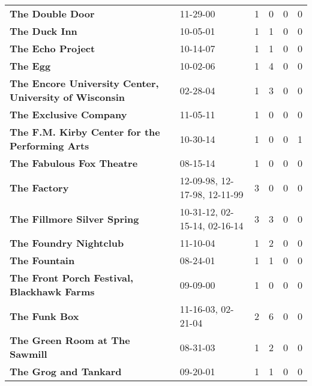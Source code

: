 \begin{supertabular}{llllll}
                                             \textbf{The Double Door} &                      11-29-00 &  1 &   0 &  0 &  0 \\
                                                \textbf{The Duck Inn} &                      10-05-01 &  1 &   1 &  0 &  0 \\
                                            \textbf{The Echo Project} &                      10-14-07 &  1 &   1 &  0 &  0 \\
                                                     \textbf{The Egg} &                      10-02-06 &  1 &   4 &  0 &  0 \\
       \textbf{The Encore University Center, University of Wisconsin} &                      02-28-04 &  1 &   3 &  0 &  0 \\
                                       \textbf{The Exclusive Company} &                      11-05-11 &  1 &   0 &  0 &  0 \\
               \textbf{The F.M. Kirby Center for the Performing Arts} &                      10-30-14 &  1 &   0 &  0 &  1 \\
                                    \textbf{The Fabulous Fox Theatre} &                      08-15-14 &  1 &   0 &  0 &  0 \\
                                                 \textbf{The Factory} &  12-09-98, 12-17-98, 12-11-99 &  3 &   0 &  0 &  0 \\
                                  \textbf{The Fillmore Silver Spring} &  10-31-12, 02-15-14, 02-16-14 &  3 &   3 &  0 &  0 \\
                                       \textbf{The Foundry Nightclub} &                      11-10-04 &  1 &   2 &  0 &  0 \\
                                                \textbf{The Fountain} &                      08-24-01 &  1 &   1 &  0 &  0 \\
                   \textbf{The Front Porch Festival, Blackhawk Farms} &                      09-09-00 &  1 &   0 &  0 &  0 \\
                                                \textbf{The Funk Box} &            11-16-03, 02-21-04 &  2 &   6 &  0 &  0 \\
                               \textbf{The Green Room at The Sawmill} &                      08-31-03 &  1 &   2 &  0 &  0 \\
                                        \textbf{The Grog and Tankard} &                      09-20-01 &  1 &   1 &  0 &  0 \\

\end{supertabular}
